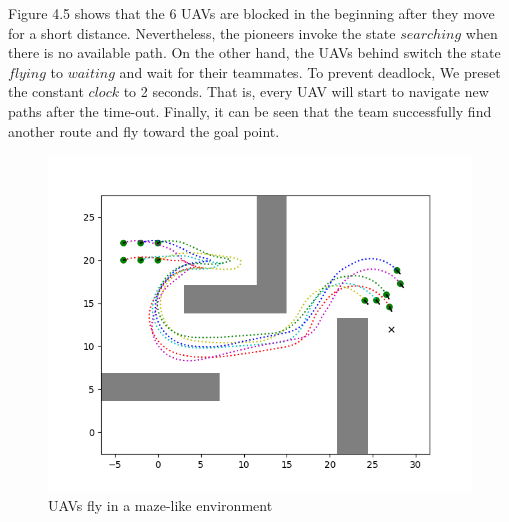 Figure 4.5 shows that the 6 UAVs are blocked in the beginning after they move for a short distance. Nevertheless, the pioneers invoke the state $searching$ when there is no available path. On the other hand, the UAVs behind switch the state $flying$ to $waiting$ and wait for their teammates. To prevent deadlock, We preset the constant $clock$ to 2 seconds. That is, every UAV will start to navigate new paths after the time-out. Finally, it can be seen that the team successfully find another route and fly toward the goal point.

\begin{figure}[H]
    \centering
    \includegraphics[scale=1]{figures/comprehensive_simulation_2.png}
    \caption{\label{tab:table-name} UAVs fly in a maze-like environment}
    \label{fig:fig_label}
\end{figure}
